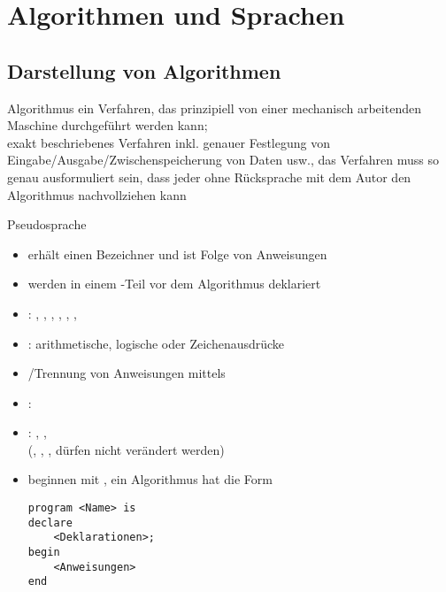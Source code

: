 \chapter{%
    Algorithmen und Sprachen%
}

\section{%
    Darstellung von Algorithmen%
}

\begin{Def}{Algorithmus}
    ein Verfahren, das prinzipiell von einer mechanisch arbeitenden
    Maschine durchgeführt werden kann; \\
    exakt beschriebenes Verfahren inkl. genauer Festlegung von
    Eingabe/Ausgabe/Zwischen\-spei\-cherung von Daten usw., das Verfahren
    muss so genau ausformuliert sein, dass jeder ohne Rücksprache mit dem
    Autor den Algorithmus nachvollziehen kann
\end{Def}

\begin{Def}{Pseudosprache}
    \begin{itemize}
        \item {} erhält einen Bezeichner und ist Folge von
        Anweisungen

        \item {} werden in einem -Teil vor
        dem Algorithmus deklariert

        \item {}: , \quad
        , \quad
        , \quad {}, \quad
        , \quad
        , \quad

        \item {}: arithmetische, logische oder
        Zeichenausdrücke

        \item {}/Trennung von Anweisungen
        mittels \pseudocode{;}

        \item {}:

        \item {}: , \quad
        , \\
         \quad
        (, , , 
        dürfen nicht verändert werden)

        \item {} beginnen mit \pseudocode{{-}{-}}, ein
        Algorithmus hat die Form

\begin{lstlisting}[language=pseudosprache]
program <Name> is
declare
    <Deklarationen>;
begin
    <Anweisungen>
end
\end{lstlisting}
    \end{itemize}
\end{Def}

